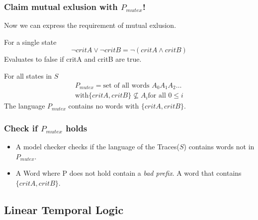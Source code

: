 \documentclass{beamer}
\begin{document}
\begin{frame}
  \frametitle{Claim mutual exlusion with $P_{mutex}$! }
  Now we can express the requirement of mutual exlusion.
  \begin{block}{For a single state}
\[
 \neg critA \lor \neg critB = \neg( critA \land critB)
\]
Evaluates to false if critA and critB are true.
  \end{block}

\begin{block}{For all states in $S$}
\begin{multline}
P_{mutex} = \text{set of all words } A_0 A_1 A_2 \dots \\ \text{with} \{critA,critB\} \not \subseteq A_i \text{for all } 0 \leq i
\end{multline}
The language $P_{mutex}$ contains no words with $\{critA,critB\}$.
\end{block}
\end{frame}

\begin{frame}
  \frametitle{Check if $P_{mutex}$ holds}
  \begin{itemize}
  \item   A model checker checks if the language of the Traces($S$) contains words not in $P_{mutex}$.
  \item  A Word where P does not hold contain a \textit{bad prefix}. A word that contains $\{critA,critB\}$.
  \end{itemize}

\end{frame}

\subsection{Linear Temporal Logic}
\end{document}
